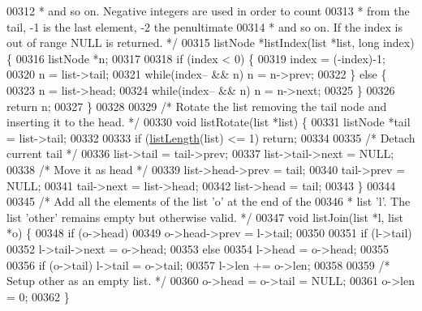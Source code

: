 \begin{DoxyCode}
00312 \textcolor{comment}{ * and so on. Negative integers are used in order to count}
00313 \textcolor{comment}{ * from the tail, -1 is the last element, -2 the penultimate}
00314 \textcolor{comment}{ * and so on. If the index is out of range NULL is returned. */}
00315 listNode *listIndex(list *list, \textcolor{keywordtype}{long} index) \{
00316     listNode *n;
00317 
00318     \textcolor{keywordflow}{if} (index < 0) \{
00319         index = (-index)-1;
00320         n = list->tail;
00321         \textcolor{keywordflow}{while}(index-- && n) n = n->prev;
00322     \} \textcolor{keywordflow}{else} \{
00323         n = list->head;
00324         \textcolor{keywordflow}{while}(index-- && n) n = n->next;
00325     \}
00326     \textcolor{keywordflow}{return} n;
00327 \}
00328 
00329 \textcolor{comment}{/* Rotate the list removing the tail node and inserting it to the head. */}
00330 \textcolor{keywordtype}{void} listRotate(list *list) \{
00331     listNode *tail = list->tail;
00332 
00333     \textcolor{keywordflow}{if} (\hyperlink{adlist_8h_afde0ab079f934670e82119b43120e94b}{listLength}(list) <= 1) \textcolor{keywordflow}{return};
00334 
00335     \textcolor{comment}{/* Detach current tail */}
00336     list->tail = tail->prev;
00337     list->tail->next = NULL;
00338     \textcolor{comment}{/* Move it as head */}
00339     list->head->prev = tail;
00340     tail->prev = NULL;
00341     tail->next = list->head;
00342     list->head = tail;
00343 \}
00344 
00345 \textcolor{comment}{/* Add all the elements of the list 'o' at the end of the}
00346 \textcolor{comment}{ * list 'l'. The list 'other' remains empty but otherwise valid. */}
00347 \textcolor{keywordtype}{void} listJoin(list *l, list *o) \{
00348     \textcolor{keywordflow}{if} (o->head)
00349         o->head->prev = l->tail;
00350 
00351     \textcolor{keywordflow}{if} (l->tail)
00352         l->tail->next = o->head;
00353     \textcolor{keywordflow}{else}
00354         l->head = o->head;
00355 
00356     \textcolor{keywordflow}{if} (o->tail) l->tail = o->tail;
00357     l->len += o->len;
00358 
00359     \textcolor{comment}{/* Setup other as an empty list. */}
00360     o->head = o->tail = NULL;
00361     o->len = 0;
00362 \}
\end{DoxyCode}
